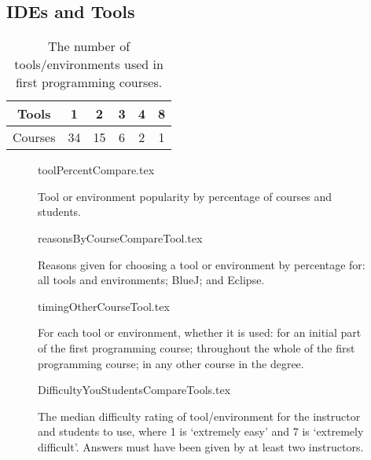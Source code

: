 \documentclass{sig-alternate}
\begin{document}
\subsection{IDEs and Tools}

\begin{table}[]
\centering
\caption{The number of tools/environments used in first programming courses.}
\label{tab:numTools}
\begin{tabular}{cccccc}
\hline
Tools   & 1  & 2  & 3 & 4 & 8 \\ \hline
Courses & 34 & 15 & 6 & 2 & 1 \\ \hline
\end{tabular}
\end{table}

\begin{figure}
\begin{center}
{toolPercentCompare.tex}
\caption{Tool or environment popularity by percentage of courses and students.}
\end{center}
\end{figure}

\begin{figure}
\begin{center}
{reasonsByCourseCompareTool.tex}
\end{center}
\caption{Reasons given for choosing a tool or environment by percentage for: all tools and environments; BlueJ; and Eclipse.}
\end{figure}

\begin{figure}
\begin{center}
{timingOtherCourseTool.tex}
\end{center}
\caption{For each tool or environment, whether it is used: for an initial part of the first programming course; throughout the whole of the first programming course; in any other course in the degree.}
\end{figure}


\begin{figure}
\begin{center}
{DifficultyYouStudentsCompareTools.tex}
\end{center}
\caption{The median difficulty rating of tool/environment for the instructor and students to use, where 1 is `extremely easy' and 7 is `extremely difficult'.  Answers must have been given by at least two instructors.}
\end{figure}
\end{document}
